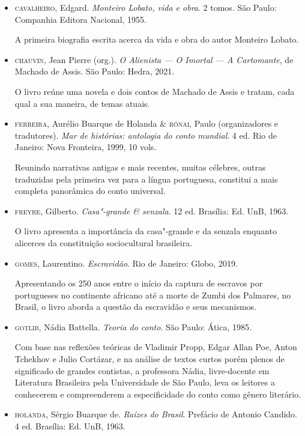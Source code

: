 \documentclass[11pt]{extarticle}
\begin{document}
\begin{itemize}
\item  \textsc{cavalheiro}, Edgard. \emph{Monteiro Lobato, vida e obra}. 2 tomos. São
Paulo: Companhia Editora Nacional, 1955.

A primeira biografia escrita acerca da vida e obra do autor Monteiro Lobato.

\item  \textsc{chauvin}, Jean Pierre (org.). \emph{O Alienista --- O Imortal --- A
Cartomante}, de Machado de Assis. São Paulo: Hedra, 2021.

O livro reúne uma novela e dois contos de Machado de Assis e tratam, cada qual 
a sua maneira, de temas atuais.

\item  \textsc{ferreira}, Aurélio Buarque de Holanda \& \textsc{rónai}, Paulo (organizadores e
tradutores). \emph{Mar de histórias: antologia do conto mundial}. 4 ed.
Rio de Janeiro: Nova Fronteira, 1999, 10 vols. 

Reunindo narrativas antigas e mais recentes, muitas célebres, outras traduzidas
pela primeira vez para a língua portuguesa, constitui a mais completa
panorâmica do conto universal.

\item \textsc{freyre}, Gilberto. \emph{Casa"-grande \& senzala}. 12 ed. Brasília: Ed.
UnB, 1963.

O livro apresenta a importância da casa"-grande e da senzala enquanto alicerces da 
constituição sociocultural brasileira. 

\item \textsc{gomes}, Laurentino. \emph{Escravidão}. Rio de Janeiro: Globo, 2019.

Apresentando os 250 anos entre o início da captura de escravos por portugueses no 
continente africano até a morte de Zumbi dos Palmares, no Brasil, o livro aborda
a questão da escravidão e seus mecanismos.

\item \textsc{gotlib}, Nádia Battella. \emph{Teoria do conto}. São Paulo: Ática, 1985.

Com base nas reflexões teóricas de Vladimir Propp, Edgar Allan Poe,
Anton Tchekhov e Julio Cortázar, e na análise de textos curtos porém
plenos de significado de grandes contistas, a professora Nádia,
livre-docente em Literatura Brasileira pela Universidade de São Paulo,
leva os leitores a conhecerem e compreenderem a especificidade do conto
como gênero literário.

\item \textsc{holanda}, Sérgio Buarque de. \emph{Raízes do Brasil}. Prefácio de Antonio
Candido. 4 ed. Brasília: Ed. UnB, 1963.


\end{itemize}
\end{document}
